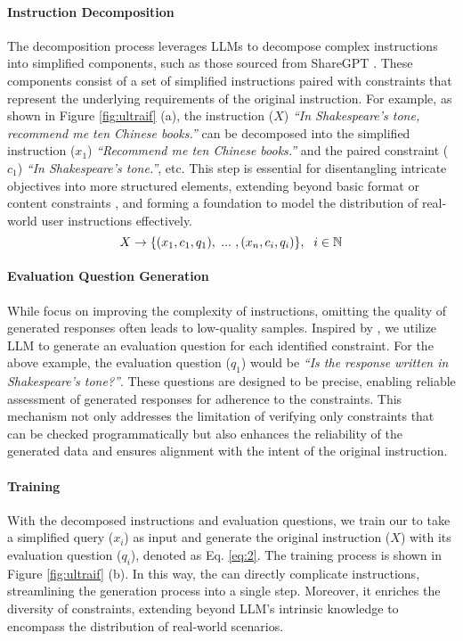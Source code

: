 \paragraph{Instruction Decomposition}
The decomposition process leverages LLMs to decompose complex instructions into simplified components, such as those sourced from ShareGPT \citep{vicuna2023}. These components consist of a set of simplified instructions paired with constraints that represent the underlying requirements of the original instruction. For example, as shown in Figure \ref{fig:ultraif} (a), the instruction ($X$) \textit{``In Shakespeare's tone, recommend me ten Chinese books.''} can be decomposed into the simplified instruction ($x_1$) \textit{``Recommend me ten Chinese books.''} and the paired constraint ($c_1$) \textit{``In Shakespeare's tone.''}, etc. This step is essential for disentangling intricate objectives into more structured elements, extending beyond basic format or content constraints \citep{dong2024self,wang-etal-2023-self-instruct}, and forming a foundation to model the distribution of real-world user instructions effectively.
\begin{equation}
    \small
    X \to \{(x_1, c_1, q_1),\ ...\ , (x_n, c_i,q_i)\},\ \ i\in \mathbb{N} 
\end{equation}

\paragraph{Evaluation Question Generation}
While \citet{xu2023wizardlm,wang-etal-2023-self-instruct} focus on improving the complexity of instructions, omitting the quality of generated responses often leads to low-quality samples. Inspired by \citet{qin2024infobench}, we utilize LLM to generate an evaluation question for each identified constraint. For the above example, the evaluation question ($q_1$) would be \textit{``Is the response written in Shakespeare's tone?''}. These questions are designed to be precise, enabling reliable assessment of generated responses for adherence to the constraints. This mechanism not only addresses the limitation of verifying only constraints that can be checked programmatically \citep{dong2024self} but also enhances the reliability of the generated data and ensures alignment with the intent of the original instruction.




\paragraph{\composer Training}
With the decomposed instructions and evaluation questions, we train our \composer to take a simplified query  ($x_i$) as input and generate the original instruction ($X$) with its evaluation question ($q_i$), denoted as Eq. \ref{eq:2}. The training process is shown in Figure \ref{fig:ultraif} (b).
In this way, the \composer can directly complicate instructions, streamlining the generation process into a single step. Moreover, it enriches the diversity of constraints, extending beyond LLM's intrinsic knowledge to encompass the distribution of real-world scenarios.

